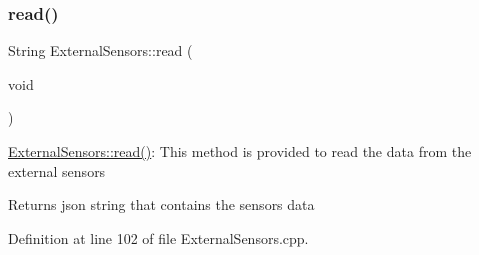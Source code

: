 \subsubsection{\texorpdfstring{read()}{read()}}
{\footnotesize\ttfamily String External\+Sensors\+::read (\begin{DoxyParamCaption}\item[{void}]{ }\end{DoxyParamCaption})}

\hyperlink{class_external_sensors_a53177b81eca3be89508b5511ddcd00fc}{External\+Sensors\+::read()}\+: This method is provided to read the data from the external sensors

\begin{DoxyReturn}{Returns}
json string that contains the sensors data 
\end{DoxyReturn}


Definition at line 102 of file External\+Sensors.\+cpp.


